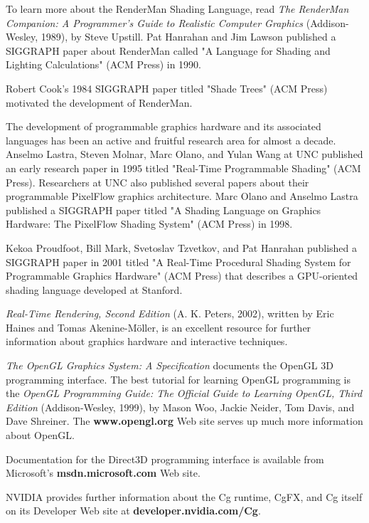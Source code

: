 \documentclass{book}
\begin{document}
To learn more about the RenderMan Shading Language, read \textit{The RenderMan Companion: A Programmer's Guide to Realistic Computer Graphics} (Addison-Wesley, 1989), by Steve Upstill. Pat Hanrahan and Jim Lawson published a SIGGRAPH paper about RenderMan called "A Language for Shading and Lighting Calculations" (ACM Press) in 1990.

Robert Cook's 1984 SIGGRAPH paper titled "Shade Trees" (ACM Press) motivated the development of RenderMan.

The development of programmable graphics hardware and its associated languages has been an active and fruitful research area for almost a decade. Anselmo Lastra, Steven Molnar, Marc Olano, and Yulan Wang at UNC published an early research paper in 1995 titled "Real-Time Programmable Shading" (ACM Press). Researchers at UNC also published several papers about their programmable PixelFlow graphics architecture. Marc Olano and Anselmo Lastra published a SIGGRAPH paper titled "A Shading Language on Graphics Hardware: The PixelFlow Shading System" (ACM Press) in 1998.

Kekoa Proudfoot, Bill Mark, Svetoslav Tzvetkov, and Pat Hanrahan published a SIGGRAPH paper in 2001 titled "A Real-Time Procedural Shading System for Programmable Graphics Hardware" (ACM Press) that describes a GPU-oriented shading language developed at Stanford.

\textit{Real-Time Rendering, Second Edition} (A. K. Peters, 2002), written by Eric Haines and Tomas Akenine-Möller, is an excellent resource for further information about graphics hardware and interactive techniques.

\textit{The OpenGL Graphics System: A Specification} documents the OpenGL 3D programming interface. The best tutorial for learning OpenGL programming is the \textit{OpenGL Programming Guide: The Official Guide to Learning OpenGL, Third Edition} (Addison-Wesley, 1999), by Mason Woo, Jackie Neider, Tom Davis, and Dave Shreiner. The \textbf{www.opengl.org} Web site serves up much more information about OpenGL.

Documentation for the Direct3D programming interface is available from Microsoft's \textbf{msdn.microsoft.com} Web site.

NVIDIA provides further information about the Cg runtime, CgFX, and Cg itself on its Developer Web site at \textbf{developer.nvidia.com/Cg}.
\end{document}

